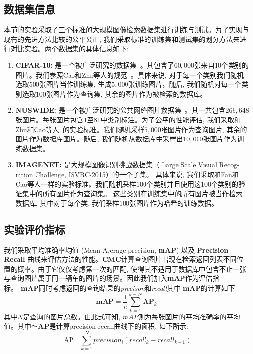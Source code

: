   \subsection{数据集信息}
  本节的实验采取了三个标准的大规模图像检索数据集进行训练与测试。为了实现与现有的先进方法比较的公平公正, 我们采取标准的训练集和测试集的划分方法来进行对比实验。两个数据集的具体信息如下:
  \begin{enumerate}
    \item \textbf{CIFAR-10:} 是一个被广泛研究的数据集~\cite{krizhevsky2009learning}。其包含了$60,000$张来自$10$个类别的图片。我们参照Cao和Zhu等人的规范~\cite{cao2018deep,zhu2016deep}。具体来说, 对于每一个类别我们随机选取$500$张图片当作训练集, 生成$5,000$张训练图片。随后, 我们随机对每一个类别选取$100$张图片作为查询集, 其余的图片作为被检索的数据库。
    \item \textbf{NUSWIDE:} 是一个被广泛研究的公共网络图片数据集~\cite{chua2009nus}。其一共包含$269,648$张图片。每张图片包含1至81中类别标注。为了公平的性能评估, 我们采取和Zhu和Cao等人~\cite{cao2017hashnet,zhu2016deep}的实验标准。我们随机采样$5,000$张图片作为查询图片, 其余的图片作为数据库图片。随后, 我们随机从数据库中采样出$10,000$张图片作为训练数据集。
    \item \textbf{IMAGENET:} 是大规模图像识别挑战数据集（ Large Scale Visual Recog-
    nition Challenge, ISVRC-2015）的一个子集。 具体来说, 我们采取和Fan和Cao等人\cite{fan20deep, cao2017hashnet}一样的实验标准。我们随机采样$100$个类别并且使用这$100$个类别的验证集中的所有图片作为查询集。 这些类别在训练集中的所有图片被当作检索数据库, 其中对于每个类, 我们采样$100$张图片作为哈希的训练数据。
  \end{enumerate}

  \subsection{实验评价指标}
  我们采取平均准确率均值 (Mean Average precision, \textbf{mAP}) 以及 \textbf{Precision}-\textbf{Recall}   曲线来评估方法的性能。\textbf{CMC}计算查询图片出现在检索返回列表不同位置的概率。由于它仅仅考虑第一次的匹配, 使得其不适用于数据库中包含不止一张与查询图片属于同一辆车的图片的场景。因此我们加入\textbf{mAP}作为评估指标。~\textbf{mAP}同时考虑返回的查询结果的\textit{precison}和\textit{recall}其中 \textbf{mAP}的计算如下
  \begin{equation}
     \textbf{mAP} = \frac{1}{n} \sum_{k=1}^{k= N} \textbf{AP}_k
  \end{equation}
  其中$N$是查询的图片总数。由此式可知, $mAP$则为每张图片的平均准确率的平均值。其中～\textbf{AP}是计算precision-recall曲线下的面积, 如下所示:
  \begin{equation}
    \text { AP }^{=} \sum_{k=1}^{N} precision _{i}\left( recall _{k}- recall _{k-1}\right)
\end{equation}

